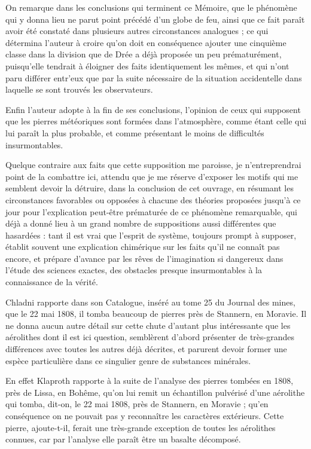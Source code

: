 \documentclass[a4paper, 12pt, oneside, french]{article}
\begin{document}
On remarque dans les conclusions qui terminent ce Mémoire, que le phénomène qui y donna lieu ne parut point précédé d'un globe de feu, ainsi que ce fait paraît avoir été constaté dans plusieurs autres circonstances analogues ; ce qui détermina l'auteur à croire qu'on doit en conséquence ajouter une cinquième classe dans la division que de Drée a déjà proposée un peu prématurément, puisqu'elle tendrait à éloigner des faits identiquement les mêmes, et qui n'ont paru différer entr'eux que par la suite nécessaire de la situation accidentelle dans laquelle se sont trouvés les observateurs.

Enfin l'auteur adopte à la fin de ses conclusions, l'opinion de ceux qui supposent que les pierres météoriques sont formées dans l'atmosphère, comme étant celle qui lui paraît la plus probable, et comme présentant le moins de difficultés insurmontables.

Quelque contraire aux faits que cette supposition me paroisse, je n'entreprendrai point de la combattre ici, attendu que je me réserve d'exposer les motifs qui me semblent devoir la détruire, dans la conclusion de cet ouvrage, en résumant les circonstances favorables ou opposées à chacune des théories proposées jusqu'à ce jour pour l'explication peut-être prématurée de ce phénomène remarquable, qui déjà a donné lieu à un grand nombre de suppositions aussi différentes que hasardées : tant il est vrai que l'esprit de système, toujours prompt à supposer, établit souvent une explication chimérique sur les faits qu'il ne connaît pas encore, et prépare d'avance par les rêves de l'imagination si dangereux dans l'étude des sciences exactes, des obstacles presque insurmontables à la connaissance de la vérité.

Chladni rapporte dans son Catalogue, inséré au tome 25 du Journal des mines, que le 22 mai 1808, il tomba beaucoup de pierres près de Stannern, en Moravie. Il ne donna aucun autre détail sur cette chute d'autant plus intéressante que les aérolithes dont il est ici question, semblèrent d'abord présenter de très-grandes différences avec toutes les autres déjà décrites, et parurent devoir former une espèce particulière dans ce singulier genre de substances minérales.

En effet Klaproth rapporte à la suite de l'analyse des pierres tombées en 1808, près de Lissa, en Bohême, qu'on lui remit un échantillon pulvérisé d'une aérolithe qui tomba, dit-on, le 22 mai 1808, près de Stannern, en Moravie ; qu'en conséquence on ne pouvait pas y reconnaître les caractères extérieurs. Cette pierre, ajoute-t-il, ferait une très-grande exception de toutes les aérolithes connues, car par l'analyse elle paraît être un basalte décomposé.
\end{document}

